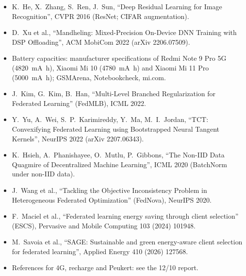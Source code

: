 \documentclass[11pt,a4paper]{article}
\begin{document}
\begin{itemize}
  \item K.~He, X.~Zhang, S.~Ren, J.~Sun, ``Deep Residual Learning for Image
        Recognition'', CVPR 2016 (ResNet; CIFAR augmentation).
  \item D.~Xu et al., ``Mandheling: Mixed-Precision On-Device DNN Training
        with DSP Offloading'', ACM MobiCom 2022 (arXiv 2206.07509).
  \item Battery capacities: manufacturer specifications of Redmi Note 9 Pro 5G
        (\SI{4820}{\milli\ampere\hour}), Xiaomi Mi 10
        (\SI{4780}{\milli\ampere\hour}) and Xiaomi Mi 11 Pro
        (\SI{5000}{\milli\ampere\hour}); GSMArena, Notebookcheck, mi.com.
  \item J.~Kim, G.~Kim, B.~Han, ``Multi-Level Branched Regularization for
        Federated Learning'' (FedMLB), ICML 2022.
  \item Y.~Yu, A.~Wei, S.~P.~Karimireddy, Y.~Ma, M.~I.~Jordan, ``TCT:
        Convexifying Federated Learning using Bootstrapped Neural Tangent
        Kernels'', NeurIPS 2022 (arXiv 2207.06343).
  \item K.~Hsieh, A.~Phanishayee, O.~Mutlu, P.~Gibbons, ``The Non-IID Data
        Quagmire of Decentralized Machine Learning'', ICML 2020 (BatchNorm
        under non-IID data).
  \item J.~Wang et al., ``Tackling the Objective Inconsistency Problem in
        Heterogeneous Federated Optimization'' (FedNova), NeurIPS 2020.
  \item F.~Maciel et al., ``Federated learning energy saving through client
        selection'' (ESCS), Pervasive and Mobile Computing 103 (2024) 101948.
  \item M.~Savoia et al., ``SAGE: Sustainable and green energy-aware client
        selection for federated learning'', Applied Energy 410 (2026) 127568.
  \item References for 4G, recharge and Peukert: see the 12/10 report.
\end{itemize}
\end{document}

